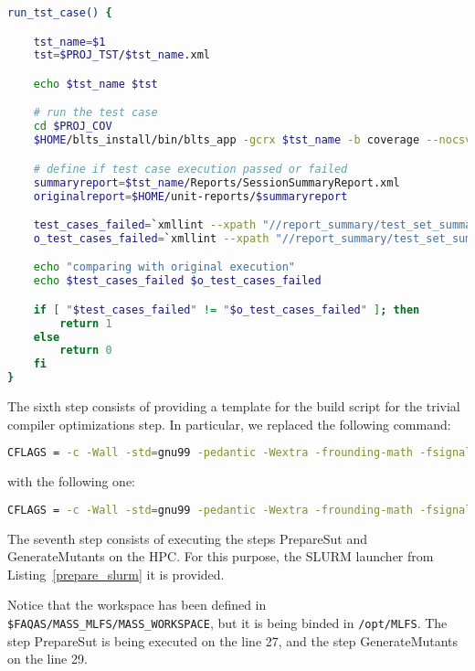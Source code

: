 \begin{lstlisting}[language=bash, label=run_test_case_hpc ,caption=Implementation of the run test case Bash function for the MLFS.]
run_tst_case() {

    tst_name=$1
    tst=$PROJ_TST/$tst_name.xml

    echo $tst_name $tst

    # run the test case
    cd $PROJ_COV
    $HOME/blts_install/bin/blts_app -gcrx $tst_name -b coverage --nocsv -s $tst

    # define if test case execution passed or failed
    summaryreport=$tst_name/Reports/SessionSummaryReport.xml
    originalreport=$HOME/unit-reports/$summaryreport

    test_cases_failed=`xmllint --xpath "//report_summary/test_set_summary/test_cases_failed/text()" $summaryreport`
    o_test_cases_failed=`xmllint --xpath "//report_summary/test_set_summary/test_cases_failed/text()" $originalreport`

    echo "comparing with original execution" 
    echo $test_cases_failed $o_test_cases_failed 

    if [ "$test_cases_failed" != "$o_test_cases_failed" ]; then
        return 1
    else
        return 0
    fi
}
\end{lstlisting}

The sixth step consists of providing a template for the build script for the trivial compiler optimizations step. In particular, we replaced the following command: 

\begin{lstlisting}[language=bash]
CFLAGS = -c -Wall -std=gnu99 -pedantic -Wextra -frounding-math -fsignaling-nans -g O2 -fno-builtin $(EXTRA_CFLAGS)
\end{lstlisting}

with the following one:

\begin{lstlisting}[language=bash]
CFLAGS = -c -Wall -std=gnu99 -pedantic -Wextra -frounding-math -fsignaling-nans TCE -fno-builtin $(EXTRA_CFLAGS)
\end{lstlisting}

The seventh step consists of executing the steps PrepareSut and GenerateMutants on the HPC. For this purpose, the SLURM launcher from Listing~\ref{prepare_slurm} it is provided.

Notice that the workspace has been defined in \texttt{\$FAQAS/MASS\_MLFS/MASS\_WORKSPACE}, but it is being binded in \texttt{/opt/MLFS}. 
The step PrepareSut is being executed on the line 27, and the step GenerateMutants on the line 29.

